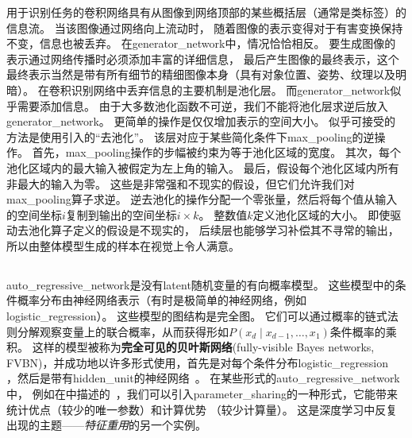 用于识别任务的卷积网络具有从图像到网络顶部的某些概括层（通常是类标签）的信息流。
当该图像通过网络向上流动时， 随着图像的表示变得对于有害变换保持不变，信息也被丢弃。
在\gls{generator_network}中，情况恰恰相反。
要生成图像的表示通过网络传播时必须添加丰富的详细信息， 最后产生图像的最终表示，这个最终表示当然是带有所有细节的精细图像本身（具有对象位置、姿势、纹理以及明暗）。
在卷积识别网络中丢弃信息的主要机制是池化层。
而\gls{generator_network}似乎需要添加信息。
由于大多数池化函数不可逆，我们不能将池化层求逆后放入\gls{generator_network}。
更简单的操作是仅仅增加表示的空间大小。
似乎可接受的方法是使用\citet{dosovitskiy2015learning}引入的``去池化''。
该层对应于某些简化条件下\gls{max_pooling}的逆操作。
首先，\gls{max_pooling}操作的步幅被约束为等于池化区域的宽度。
其次，每个池化区域内的最大输入被假定为左上角的输入。
最后，假设每个池化区域内所有非最大的输入为零。
这些是非常强和不现实的假设，但它们允许我们对\gls{max_pooling}算子求逆。
逆去池化的操作分配一个零张量，然后将每个值从输入的空间坐标$i$复制到输出的空间坐标$i \times k$。
整数值$k$定义池化区域的大小。
即使驱动去池化算子定义的假设是不现实的， 后续层也能够学习补偿其不寻常的输出， 所以由整体模型生成的样本在视觉上令人满意。


\subsection{}
\label{sec:auto_regressive_networks}
\gls{auto_regressive_network}是没有\gls{latent}随机变量的有向概率模型。
这些模型中的条件概率分布由神经网络表示（有时是极简单的神经网络，例如\gls{logistic_regression}）。
这些模型的图结构是完全图。
它们可以通过概率的链式法则分解观察变量上的联合概率，从而获得形如$P(x_d \mid x_{d-1},\dots, x_1)$条件概率的乘积。
这样的模型被称为\textbf{完全可见的贝叶斯网络}(fully-visible Bayes networks, FVBN)，并成功地以许多形式使用，首先是对每个条件分布\gls{logistic_regression}~\citep{Frey98} ，然后是带有\gls{hidden_unit}的神经网络~\citep{Bengio+Bengio-NIPS2000,Larochelle+Murray-2011-small}。
在某些形式的\gls{auto_regressive_network}中， 例如在中描述的~\citep{Larochelle+Murray-2011-small}，我们可以引入\gls{parameter_sharing}的一种形式，它能带来统计优点（较少的唯一参数）和计算优势 （较少计算量）。
这是深度学习中反复出现的主题——\emph{特征重用}的另一个实例。


\subsection{}
\label{sec:linear_auto_regressive_networks}

